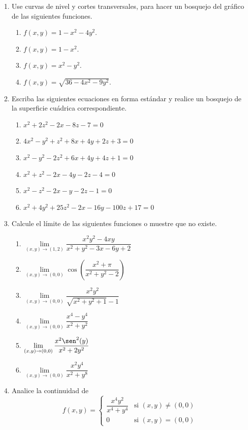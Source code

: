 \documentclass{article}
\begin{document}
\begin{enumerate}
\begin{enumerate}
    \end{enumerate}
  \vspace{2mm}
  \item Use curvas de nivel y cortes transversales, para hacer un bosquejo del gráfico de las siguientes funciones.
    \begin{enumerate}
      \item $f(x,y)=1-x^2-4y^2$.
      \item $f(x,y)=1-x^2$.
      \item $f(x,y)=x^2-y^2$.
      \item $f(x,y)=\sqrt{36-4x^2-9y^2}$.
    \end{enumerate}
  \vspace{2mm}
  \item Escriba las siguientes ecuaciones en forma estándar y realice un bosquejo de la superficie cuádrica correspondiente.
    \begin{enumerate}
      \item $x^2+2z^2-2x-8z-7=0$
      \item $4x^2-y^2+z^2+8x+4y+2z+3=0$
      \item $x^2-y^2-2z^2+6x+4y+4z+1=0$
      \item $x^2+z^2-2x-4y-2z-4=0$
      \item $x^2-z^2-2x-y-2z-1=0$
      \item $x^2+4y^2+25z^2-2x-16y-100z+17=0$
    \end{enumerate}
  \vspace{2mm}
  \newpage
  \item Calcule el límite de las siguientes funciones o muestre que no existe.
    \begin{enumerate}
      \item $\lim\limits_{(x,y)\to(1,2)}\dfrac{x^2y^2-4xy}{x^2+y^2-3x-6y+2}$
      \item $\lim\limits_{(x,y)\to(0,0)}\cos\left(\dfrac{x^2+\pi}{x^2+y^2-2}\right)$
      \item $\lim\limits_{(x,y)\to(0,0)}\dfrac{x^2y^2}{\sqrt{x^2+y^2+1}-1}$
      \item $\lim\limits_{(x,y)\to(0,0)}\dfrac{x^4-y^4}{x^2+y^2}$
      \item $\lim\limits_{(x,y)\to(0,0)}\dfrac{x^2\sen^2(y)}{x^2+2y^2}$
      \item $\lim\limits_{(x,y)\to(0,0)}\dfrac{x^2y^4}{x^2+y^8}$
    \end{enumerate}
  \vspace{2mm}
  \item Analice la continuidad de 
    $$f(x,y)=\begin{cases}
      \dfrac{x^4y^2}{x^4+y^4} & \text{si } (x,y)\neq(0,0)\\
      0 & \text{si } (x,y)=(0,0)
    \end{cases}$$
\end{enumerate}
\end{document}
